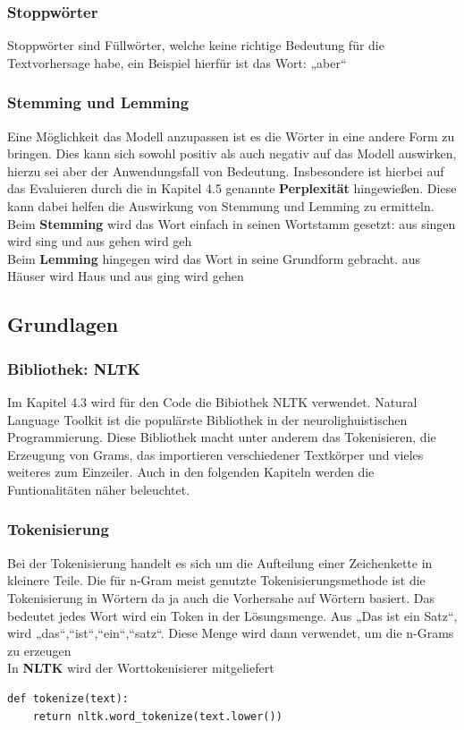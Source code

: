 \documentclass[12pt]{article}
\begin{document}
\subsubsection{Stoppwörter}
\quad Stoppwörter sind Füllwörter, welche keine richtige Bedeutung für die Textvorhersage habe, ein Beispiel hierfür ist das Wort: „aber“
\subsubsection{Stemming und Lemming}
\quad Eine Möglichkeit das Modell anzupassen ist es die Wörter in eine andere Form zu bringen. Dies kann sich sowohl positiv als auch negativ auf das Modell auswirken, hierzu sei aber der Anwendungsfall von Bedeutung. Insbesondere ist hierbei auf das Evaluieren durch die in Kapitel 4.5 genannte \textbf{Perplexität} hingewießen. Diese kann dabei helfen die Auswirkung von Stemmung und Lemming zu ermitteln.
\\Beim \textbf{Stemming} wird das Wort einfach in seinen Wortstamm gesetzt: aus singen wird sing und aus gehen wird geh
\\Beim \textbf{Lemming} hingegen wird das Wort in seine Grundform gebracht. aus Häuser wird Haus und aus ging wird gehen
\subsection{Grundlagen}
\subsubsection{Bibliothek: NLTK}
\quad Im Kapitel 4.3 wird für den Code die Bibiothek NLTK verwendet. Natural Language Toolkit ist die populärste Bibliothek in der neurolighuistischen Programmierung. Diese Bibliothek macht unter anderem das Tokenisieren, die Erzeugung von Grams, das importieren verschiedener Textkörper und vieles weiteres zum Einzeiler. Auch in den folgenden Kapiteln werden die Funtionalitäten näher beleuchtet.
\subsubsection{Tokenisierung}
\quad Bei der Tokenisierung handelt es sich um die Aufteilung einer Zeichenkette in kleinere Teile. Die für n-Gram meist genutzte Tokenisierungsmethode ist die Tokenisierung in Wörtern da ja auch die Vorhersahe auf Wörtern basiert. Das bedeutet jedes Wort wird ein Token in der Lösungsmenge. Aus „Das ist ein Satz“, wird {„das“,“ist“,“ein“,“satz“}. Diese Menge wird dann verwendet, um die n-Grams zu erzeugen
\\In \textbf{NLTK} wird der Worttokenisierer mitgeliefert
\begin{lstlisting}
def tokenize(text):
    return nltk.word_tokenize(text.lower())
\end{lstlisting}
\end{document}
